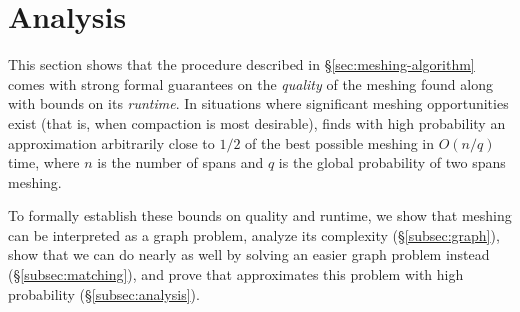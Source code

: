 \section{Analysis}
\label{sec:theory}


\newenvironment{claimproof}[1]{\par\noindent\underline{Proof:}\space#1}{\hfill $\blacksquare$}





\newcommand{\bigo}{\mathcal{O}}
\newcommand{\page}{\pi}
\newcommand{\str}{s}
\newcommand{\node}{\mathit {v}}
\newcommand{\W}{\mathcal {W}}
\newcommand{\lp}{\left(}
\newcommand{\rparen}{\right)}
\newcommand{\rp}{\right)}

This section shows that the \sm procedure described in
\S\ref{sec:meshing-algorithm} comes with strong formal guarantees on
the \textit{quality} of the meshing found along with bounds on its
\textit{runtime}.  In situations where significant meshing
opportunities exist (that is, when compaction is most desirable), \sm
finds with high probability an approximation arbitrarily close to
$1/2$ of the best possible meshing in $O\lp n/q\rparen$ time, where
$n$ is the number of spans and $q$ is the global probability of two
spans meshing.

To formally establish these bounds on quality and runtime, we show
that meshing can be interpreted as a graph problem, analyze its
complexity (\S\ref{subsec:graph}), show that we can do nearly as well
by solving an easier graph problem instead (\S\ref{subsec:matching}),
and prove that \sm approximates this problem with high probability
(\S\ref{subsec:analysis}).


